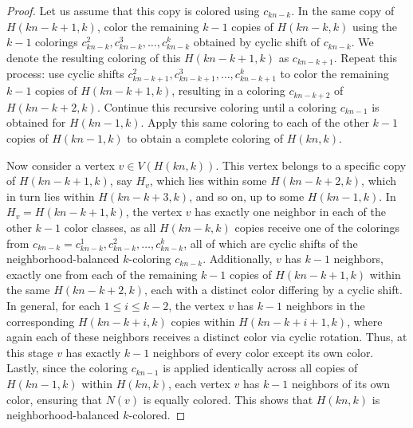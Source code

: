 \documentclass[12pt]{article}
\newcommand{\nbcd}{neighborhood-balanced $k$-colored\xspace}
\begin{document}
\begin{proof}
Let us assume that this copy is colored using \( c_{kn-k} \).
In the same copy of \( H(kn - k + 1, k) \), color the remaining \( k - 1 \) copies of \( H(kn - k, k) \) using the $k-1$ colorings \( c^2_{kn-k}, c^3_{kn-k}, \dots, c^{k}_{kn-k} \) obtained by cyclic shift of \( c_{kn-k} \).
We denote the resulting coloring of this \( H(kn - k + 1, k) \) as \( c_{kn-k+1} \).
Repeat this process: use cyclic shifts \( c^2_{kn-k+1}, c^3_{kn-k+1}, \dots, c^{k}_{kn-k+1} \) to color the remaining \( k - 1 \) copies of \( H(kn - k + 1, k) \), resulting in a coloring \( c_{kn-k+2} \) of  \( H(kn - k + 2, k) \).
Continue this recursive coloring until a coloring \( c_{kn-1} \) is obtained for \( H(kn  - 1, k) \).
Apply this same coloring to each of the other \( k - 1 \) copies of \( H(kn  - 1, k) \) to obtain a complete coloring of \( H(kn, k) \).
\par
Now consider a vertex \( v \in V(H(kn, k)) \).
This vertex belongs to a specific copy of \( H(kn - k+1, k) \), say $H_v$, which lies within some \( H(kn - k + 2, k) \), which in turn lies within \( H(kn - k + 3, k) \), and so on, up to some \( H(kn  - 1, k) \).
In \(H_v =  H(kn - k+1, k) \), the vertex \( v \) has exactly one neighbor in each of the other $k-1$ color classes, as all $H(kn-k,k)$ copies receive one of the colorings from \( c_{kn-k} = c^1_{kn-k}, c^2_{kn-k}, \dots, c^{k}_{kn-k} \), all of which are cyclic shifts of the neighborhood-balanced $k$-coloring $c_{kn-k}$.
Additionally, \( v \) has \( k - 1 \) neighbors, exactly one from each of the remaining $k-1$ copies of \( H(kn - k+1, k) \) within the same \( H(kn - k + 2, k) \), each with a distinct color differing by a cyclic shift.
In general, for each \( 1 \leq i \leq k - 2 \), the vertex \( v \) has \( k - 1 \) neighbors in the corresponding \( H(kn - k + i, k) \) copies within \( H(kn - k + i + 1, k) \), where again each of these neighbors receives a distinct color via cyclic rotation.
Thus, at this stage \( v \) has exactly \( k - 1 \) neighbors of every color except its own color.
Lastly, since the coloring \( c_{kn-1} \) is applied identically across all copies of \( H(kn - 1, k) \) within \( H(kn, k) \), each vertex \( v \) has \( k - 1 \) neighbors of its own color, ensuring that $N(v)$ is equally colored.
This shows that $H(kn, k)$ is \nbcd.
\end{proof}
\end{document}
